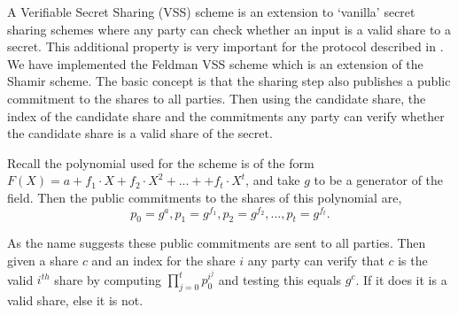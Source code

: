 \documentclass[ %
                    author={Nicholas Tutte},
                supervisor={Prof. Nigel Smart},
                    degree={MEng},
                     title={Secure Two Party Computation},
                  subtitle={A practical comparison of recent protocols},
                      type={Research - GG1K},
                      year={2015} ]{dissertation}
\begin{document}
\begin{appendices}
					A Verifiable Secret Sharing (VSS) scheme is an extension to `vanilla' secret sharing schemes where any party can check whether an input is a valid share to a secret. This additional property is very important for the protocol described in \cite{Katz_Symm_CnC_2013}.\\

					We have implemented the Feldman VSS scheme which is an extension of the Shamir scheme. The basic concept is that the sharing step also publishes a public commitment to the shares to all parties. Then using the candidate share, the index of the  candidate share and the commitments any party can verify whether the candidate share is a valid share of the secret.

					Recall the polynomial used for the scheme is of the form $F(X) = a + f_1 \cdot X + f_2 \cdot X^2 + ... +  + f_t \cdot X ^ t$, and take $g$ to be a generator of the field. Then the public commitments to the shares of this polynomial are,
					$$p_0 = g^a, p_1 = g^{f_1}, p_2 = g^{f_2}, ..., p_t = g^{f_t}.$$
					
					As the name suggests these public commitments are sent to all parties. Then given a share $c$ and an index for the share $i$ any party can verify that $c$ is the valid $i^{th}$ share by computing $\prod_{j=0}^{t} p_0 ^ {i ^ j}$ and testing this equals $g ^ c$. If it does it is a valid share, else it is not.

	\end{appendices}
\end{document}
